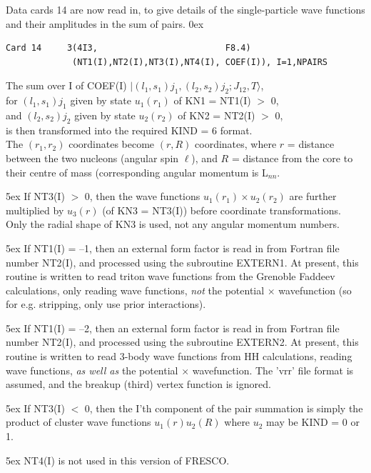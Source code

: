\documentclass[11pt]{article}
\begin{document}
\bigskip
Data cards 14 are now read in, to give details of the single-particle
wave functions and their amplitudes in the sum of pairs.
%
\hangindent 0ex
\begin{verbatim}
Card 14     3(4I3,                         F8.4)
             (NT1(I),NT2(I),NT3(I),NT4(I), COEF(I)), I=1,NPAIRS
\end{verbatim}
The sum over I of  COEF(I) $| (l_1,s_1)j_1, (l_2,s_2)j_2 ; J_{12},T \rangle$,
\\
   for  $(l_1,s_1)j_1$  given by state $u_1(r_1)$ of KN1 = NT1(I) $>$ 0,
\\
   and  $(l_2,s_2)j_2$  given by state $u_2(r_2)$ of KN2 = NT2(I) $>$ 0,
\\
is then transformed into the required KIND = 6 format.\\
The $(r_1,r_2)$ coordinates become $(r,R)$ coordinates,
where
$r$ = distance between the two nucleons (angular spin $\ell$), and
$R$ = distance from the core to their centre of mass
     (corresponding angular momentum is L$_{nn}$.

\hangindent 5ex
If NT3(I) $>$ 0, then the wave functions $u_1(r_1)\times u_2(r_2)$ are further
multiplied by $u_3(r)$ (of KN3 = NT3(I)) before coordinate transformations.
Only the radial shape of KN3 is used, not any angular momentum numbers.
\bigskip

\hangindent 5ex
If NT1(I) = --1, then an external form factor is read in from Fortran file
number NT2(I), and processed using the subroutine EXTERN1.
At present, this routine is written to read triton wave functions
from the Grenoble Faddeev calculations,
only reading wave functions, {\em not} the potential $\times$
wavefunction (so for e.g. stripping, only use prior interactions).

\hangindent 5ex
If NT1(I) = --2, then an external form factor is read in from Fortran file
number NT2(I), and processed using the subroutine EXTERN2.
At present, this routine is written to read 3-body wave functions
from HH calculations, reading wave functions, {\em as well as} the
potential $\times$ wavefunction. The 'vrr' file format is assumed,
and the breakup (third) vertex function  is ignored.
\bigskip

\hangindent 5ex
If NT3(I) $<$ 0, then the I'th component of the pair summation is simply
the product of cluster wave functions $u_1(r)  u_2(R) $
where $u_{2}$ may be KIND = 0 or 1.
\bigskip

\hangindent 5ex
NT4(I) is not used in this version of FRESCO.
\bigskip
\end{document}
